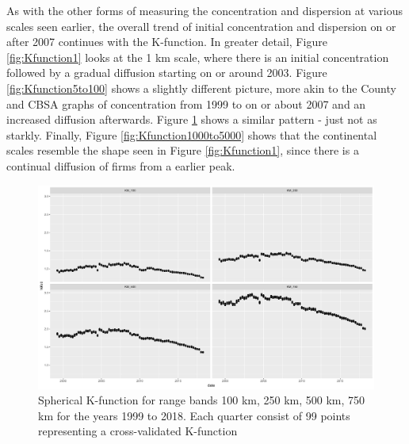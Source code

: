 
As with the other forms of measuring the concentration and dispersion at various scales seen earlier, the overall trend of initial concentration and dispersion on or after 2007 continues with the K-function.  In greater detail, Figure \ref{fig:Kfunction1} looks at the 1 km scale, where there is an initial concentration followed by a gradual diffusion starting on or around 2003. Figure \ref{fig:Kfunction5to100} shows a slightly different picture, more akin to the County and CBSA graphs of concentration from 1999 to on or about 2007 and an increased diffusion afterwards.  Figure \ref{fig:Kfunction100to750} shows a similar pattern - just not as starkly.  Finally, Figure \ref{fig:Kfunction1000to5000} shows that the continental scales resemble the shape seen in Figure \ref{fig:Kfunction1}, since there is a continual diffusion of firms from a earlier peak.  

\begin{figure}[h]
	\centering
	\includegraphics[width=.9\textwidth]{Figures/ChapterIII/RIpley_K_100_750.pdf} 
	\caption[Spherical K-function for Range Bands 100km to 750km]{Spherical K-function for range bands 100 km, 250 km, 500 km, 750 km for the years 1999 to 2018. Each quarter consist of 99 points representing a cross-validated K-function}
	\label{fig:Kfunction100to750}
\end{figure}

